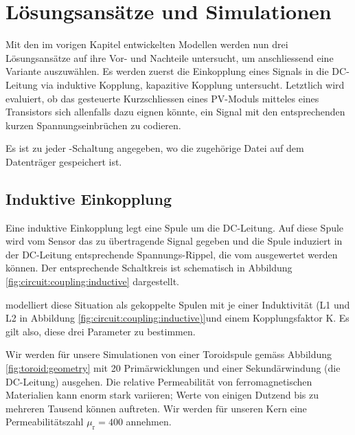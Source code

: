 \chapter{L\"osungsans\"atze und Simulationen}
\label{chap:simu}

Mit   den  im   vorigen  Kapitel   entwickelten  Modellen   werden  nun   drei
L\"osungsans\"atze auf  ihre Vor-  und Nachteile untersucht,  um anschliessend
eine   Variante  auszuw\"ahlen. Es   werden  zuerst   die  Einkopplung   eines
Signals  in  die  DC-Leitung   via  induktive  Kopplung,  kapazitive  Kopplung
untersucht. Letztlich wird  evaluiert, ob das gesteuerte  Kurzschliessen eines
PV-Moduls mitteles eines Transistors sich allenfalls dazu eignen k\"onnte, ein
Signal mit den entsprechenden kurzen Spannungseinbr\"uchen zu codieren.

Es ist zu jeder -Schaltung  angegeben, wo die zugeh\"orige Datei
auf dem Datentr\"ager gespeichert ist.

\section{Induktive Einkopplung}
\label{sec:simu:coupling:inductive}

Eine induktive Einkopplung legt eine  Spule um die DC-Leitung. Auf diese Spule
wird vom Sensor  das zu \"ubertragende Signal gegeben und  die Spule induziert
in der DC-Leitung entsprechende  Spannungs-Rippel, die vom \Master ausgewertet
werden k\"onnen. Der  entsprechende Schaltkreis  ist schematisch  in Abbildung
\ref{fig:circuit:coupling:inductive} dargestellt.

    modelliert   diese    Situation   als    gekoppelte   Spulen
mit    je     einer    Induktivit\"at     (L1    und    L2     in    Abbildung
\ref{fig:circuit:coupling:inductive)}und  einem   Kopplungsfaktor  K. Es  gilt
also, diese drei Parameter zu bestimmen.

Wir  werden   f\"ur  unsere   Simulationen  von  einer   Toroidspule  gem\"ass
Abbildung  \ref{fig:toroid:geometry}  mit   20  Prim\"arwicklungen  und  einer
Sekund\"arwindung (die DC-Leitung) ausgehen.  Die relative Permeabilit\"at von
ferromagnetischen Materialien  kann enorm  stark variieren; Werte  von einigen
Dutzend bis zu  mehreren Tausend k\"onnen auftreten. Wir  werden f\"ur unseren
Kern eine Permeabilit\"atszahl $\mu_{\mathrm{r}} = 400$ annehmen.

